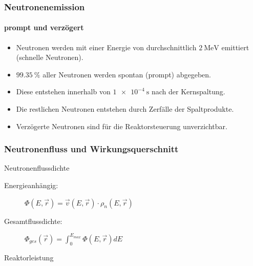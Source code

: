 \documentclass{beamer}[9pt]
\begin{document}
\begin{frame}
\frametitle{Neutronenemission}
\framesubtitle{prompt und verzögert}
\begin{itemize}
\item Neutronen werden mit einer Energie von durchschnittlich $\SI{2}{\MeV}$ emittiert (schnelle Neutronen).
\item $\SI{99.35}{\percent}$ aller Neutronen werden spontan (prompt) abgegeben.
\item Diese entstehen innerhalb von $\SI{1e-4}{\second}$   nach der Kernspaltung.
\item Die restlichen Neutronen entstehen durch Zerfälle der Spaltprodukte.
\item Verzögerte Neutronen sind für die Reaktorsteuerung unverzichtbar.
\end{itemize}
\end{frame}




\begin{frame}
\frametitle{Neutronenfluss und Wirkungsquerschnitt}
\begin{block}{Neutronenflussdichte}
\begin{description}
\item[Energieanhängig:]$\Phi(E,\vec r) = \vec v(E,\vec r)\cdot \rho_n(E,\vec r)$
\item[Gesamtflussdichte:] $\Phi_{ges}(\vec r)= \int_0^{E_{max}}\Phi(E, \vec r) dE$
\end{description}

\end{block}

\begin{block}{Reaktorleistung}

\end{block}
\end{frame}
\end{document}
